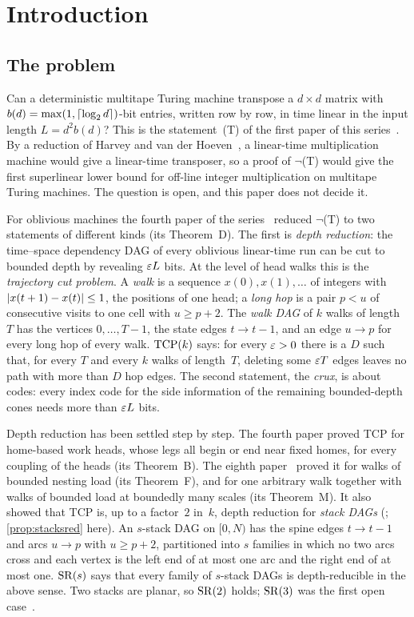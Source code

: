 \section{Introduction}\label{sec:intro}

\subsection{The problem}

Can a deterministic multitape Turing machine transpose a $d\times d$ matrix with $b(d)=\max(1,\lceil \log_2 d \rceil)$-bit entries, written
row by row, in time linear in the input length $L=d^2b(d)$? This is the statement~(T) of the first paper of this
series~\cite{FirstPaper2026}. By a reduction of Harvey and van der Hoeven~\cite[Cor.~6.9]{HvdH2025}, a linear-time
multiplication machine would give a linear-time transposer, so a proof of $\neg$(T) would give the first superlinear lower
bound for off-line integer multiplication on multitape Turing machines. The question is open, and this paper does not decide it.

For oblivious machines the fourth paper of the series~\cite{FourthPaper2026} reduced $\neg$(T) to two statements of different
kinds (its Theorem~D). The first is \emph{depth reduction}: the time--space dependency DAG of every oblivious linear-time run
can be cut to bounded depth by revealing $\varepsilon L$ bits. At the level of head walks this is the \emph{trajectory cut problem}.
A \emph{walk} is a sequence $x(0),x(1),\dots$ of integers with $\lvert x(t+1)-x(t) \rvert\le1$, the positions of one head; a
\emph{long hop} is a pair $p<u$ of consecutive visits to one cell with $u\ge p+2$. The \emph{walk DAG} of $k$ walks of length~$T$
has the vertices $0,\dots,T-1$, the state edges $t\to t-1$, and an edge $u\to p$ for every long hop of every walk. $\mathrm{TCP}(k)$
says: for every $\varepsilon>0$ there is a $D$ such that, for every $T$ and every $k$ walks of length~$T$, deleting some $\varepsilon T$ edges
leaves no path with more than $D$ hop edges. The second statement, the \emph{crux}, is about codes: every index code for the
side information of the remaining bounded-depth cones needs more than $\varepsilon L$ bits.

Depth reduction has been settled step by step. The fourth paper proved TCP for home-based work heads, whose legs all begin or
end near fixed homes, for every coupling of the heads (its Theorem~B). The eighth paper~\cite{EighthPaper2026} proved it for
walks of bounded nesting load (its Theorem~F), and for one arbitrary walk together with walks of bounded load at boundedly many
scales (its Theorem~M). It also showed that TCP is, up to a factor~$2$ in~$k$, depth reduction for \emph{stack DAGs}
(\cite[Proposition~4.5]{EighthPaper2026}; \cref{prop:stacksred} here). An $s$-stack DAG on $[0,N)$ has the spine edges
$t\to t-1$ and arcs $u\to p$ with $u\ge p+2$, partitioned into $s$ families in which no two arcs cross and each vertex is the
left end of at most one arc and the right end of at most one. $\mathrm{SR}(s)$ says that every family of $s$-stack DAGs is
depth-reducible in the above sense. Two stacks are planar, so $\mathrm{SR}(2)$ holds; $\mathrm{SR}(3)$ was the first open
case~\cite[Problem~10.2]{EighthPaper2026}.

